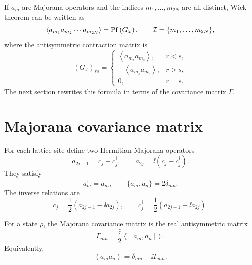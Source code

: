If $a_m$ are Majorana operators and the indices
$m_1,\ldots,m_{2N}$ are all distinct, Wick theorem can be written as
\begin{equation}
\label{eq:majorana-product-pfaffian-contraction}
    \left\langle a_{m_1}a_{m_2}\cdots a_{m_{2N}}\right\rangle
    =
    \operatorname{Pf}\left(G_{\mathcal{I}}\right),
    \qquad
    \mathcal{I}=\{m_1,\ldots,m_{2N}\},
\end{equation}
where the antisymmetric contraction matrix is
\begin{equation}
    (G_{\mathcal{I}})_{rs}
    =
    \begin{cases}
    \left\langle a_{m_r}a_{m_s}\right\rangle,& r<s,\\
    -\left\langle a_{m_s}a_{m_r}\right\rangle,& r>s,\\
    0,&r=s.
    \end{cases}
\end{equation}
The next section rewrites this formula in terms of the covariance matrix
$\Gamma$.

\section{Majorana covariance matrix}
\label{sec:majorana-covariance-matrix}

For each lattice site define two Hermitian Majorana operators
\begin{equation}
\label{eq:majorana-definition-this-chapter}
    a_{2j-1}=c_j+c_j^\dagger,
    \qquad
    a_{2j}=\ii(c_j-c_j^\dagger).
\end{equation}
They satisfy
\begin{equation}
\label{eq:majorana-clifford-algebra}
    a_m^\dagger=a_m,
    \qquad
    \{a_m,a_n\}=2\delta_{mn}.
\end{equation}
The inverse relations are
\begin{equation}
\label{eq:complex-fermion-from-majorana}
    c_j=\frac12\left(a_{2j-1}-\ii a_{2j}\right),
    \qquad
    c_j^\dagger=\frac12\left(a_{2j-1}+\ii a_{2j}\right).
\end{equation}

\begin{definition}
\label{def:majorana-covariance-matrix}
For a state $\rho$, the Majorana covariance matrix is the real antisymmetric
matrix
\begin{equation}
\label{eq:majorana-covariance-definition}
    \Gamma_{mn}
    =
    \frac{\ii}{2}\left\langle [a_m,a_n]\right\rangle .
\end{equation}
Equivalently,
\begin{equation}
\label{eq:majorana-two-point-from-gamma}
    \left\langle a_ma_n\right\rangle
    =
    \delta_{mn}-\ii\Gamma_{mn}.
\end{equation}
\end{definition}

